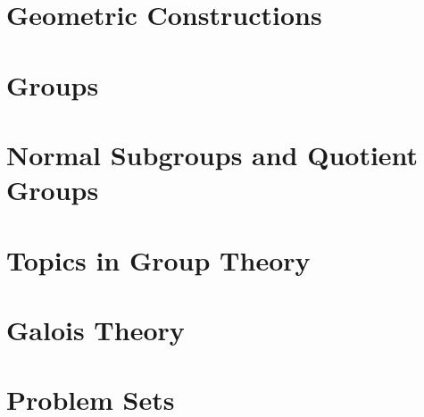 


\chapter{Geometric Constructions}



\chapter{Groups}







\chapter{Normal Subgroups and Quotient Groups}






\chapter{Topics in Group Theory}





\chapter{Galois Theory}




\chapter{Problem Sets}











